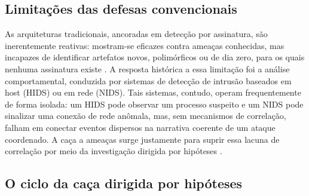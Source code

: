 \subsection{Limitações das defesas convencionais}
\label{subsec:limitacoes}

As arquiteturas tradicionais, ancoradas em detecção por assinatura, são inerentemente reativas: mostram-se eficazes contra ameaças conhecidas, mas incapazes de identificar artefatos novos, polimórficos ou de dia zero, para os quais nenhuma assinatura existe \cite{ucci2019}. A resposta histórica a essa limitação foi a análise comportamental, conduzida por sistemas de detecção de intrusão baseados em host (HIDS) ou em rede (NIDS). Tais sistemas, contudo, operam frequentemente de forma isolada: um HIDS pode observar um processo suspeito e um NIDS pode sinalizar uma conexão de rede anômala, mas, sem mecanismos de correlação, falham em conectar eventos dispersos na narrativa coerente de um ataque coordenado. A caça a ameaças surge justamente para suprir essa lacuna de correlação por meio da investigação dirigida por hipóteses \cite{10713082}.

\subsection{O ciclo da caça dirigida por hipóteses}
\label{subsec:ciclo}


